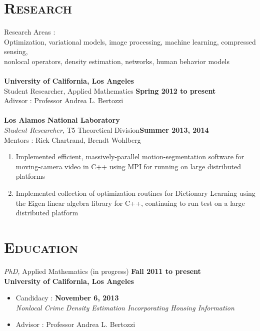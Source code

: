 \documentclass[margin, 10pt]{res} %
\begin{document}
\begin{resume}

 
\section{\textsc{Research}}

Research Areas :\\
Optimization, variational models, image processing, machine learning, compressed sensing,\\
nonlocal operators, density estimation, networks, human behavior models\\
\\
\textbf{University of California, Los Angeles}\\
Student Researcher, Applied Mathematics \hfill \textbf{Spring 2012 to present}\\
Adivsor : Professor Andrea L. Bertozzi\\
\\
\textbf{Los Alamos National Laboratory}\\
{\it Student Researcher}, T5 Theoretical Division\hfill \textbf{Summer 2013, 2014}\\
Mentors : Rick Chartrand, Brendt Wohlberg \\
\begin{enumerate}
\item Implemented efficient, massively-parallel motion-segmentation software for moving-camera video in C++ using MPI for running on large distributed platforms
\item Implemented collection of optimization routines for Dictionary Learning using the Eigen linear algebra library for C++, continuing to run test on a large distributed platform
\end{enumerate}

  



\section{\textsc{Education}}

{\sl PhD,} Applied Mathematics (in progress) \hfill \textbf{Fall 2011 to present}\\
\textbf{University of California, Los Angeles}\\
\begin{itemize}
\item Candidacy : \hfill \textbf{November 6, 2013}
\\ {\it Nonlocal Crime Density Estimation Incorporating Housing Information} 
\item Advisor : Professor Andrea L. Bertozzi
\end{itemize}


\end{resume}
\end{document}
